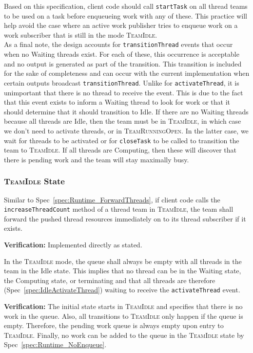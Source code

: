 \documentclass{article}
\newcommand{\TeamIdle}          {\textsc{TeamIdle}}
\newcommand{\TeamRunningOpen}   {\textsc{TeamRunningOpen}}
\begin{document}
Based on this specification, client code should call \texttt{startTask} on all
thread teams to be used on a task before enqueueing work with any of these.  This
practice will help avoid the case where an active work publisher tries to
enqueue work on a work subscriber that is still in the mode \TeamIdle.\\

As a final note, the design accounts for \texttt{transitionThread} events that
occur when no Waiting threads exist.  For each of these, this occurrence is
acceptable and no output is generated as part of the transition.  This
transition is included for the sake of completeness and can occur with the
current implementation when certain outputs broadcast \texttt{transitionThread}.
Unlike for \texttt{activateThread}, it is unimportant that there is no thread to
receive the event.  This is due to the fact that this event exists to inform a
Waiting thread to look for work or that it should determine that it should
transition to Idle.  If there are no Waiting threads because all threads are
Idle, then the team must be in \TeamIdle, in which case we don't need to
activate threads, or in \TeamRunningOpen.  In the latter case, we wait for
threads to be activated or for \texttt{closeTask} to be called to transition
the team to \TeamIdle.  If all threads are Computing, then these will discover
that there is pending work and the team will stay maximally busy.

\subsubsection{{\TeamIdle} State}
\begin{spec}
Similar to Spec~\ref{spec:Runtime_ForwardThreads}, if client code calls the
\texttt{increaseThreadCount} method of a thread team in \TeamIdle, the team shall
forward the pushed thread resources immediately on to its thread subscriber if
it exists.
\end{spec}
\textbf{Verification:}\hspace{0.125in}  Implemented directly as stated.

\begin{spec}
In the {\TeamIdle} mode, the queue shall always be empty with all threads in the
team in the Idle state.  This implies that no thread can be in the Waiting
state, the Computing state, or terminating and that all threads are therefore
(Spec~\ref{spec:IdleActivateThread}) waiting to receive the
\texttt{activateThread} event.
\end{spec}
\textbf{Verification:}\hspace{0.125in}  The initial state starts in {\TeamIdle}
and specifies that there is no work in the queue.  Also, all transitions to
{\TeamIdle} only happen if the queue is empty.  Therefore, the pending work
queue is always empty upon entry to \TeamIdle.  Finally, no work can be added to
the queue in the {\TeamIdle} state by Spec~\ref{spec:Runtime_NoEnqueue}.\\
\end{document}
